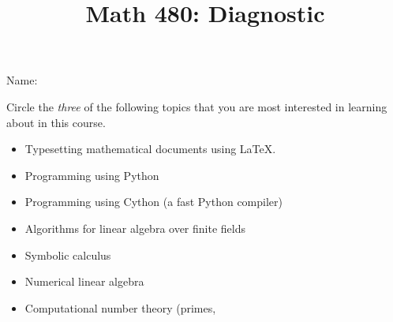 \documentclass{article}
\title{Math 480: Diagnostic}
\begin{document}
\maketitle

\newcommand{\q}[1]{\par\noindent{}#1\mbox{}\vspace{3em}\mbox{}}

\q{Name:}


\q{Circle the {\em three} of the following topics that you are most interested in learning about in this course.
\begin{itemize}

\item Typesetting mathematical documents using \LaTeX{}.
\item Programming using Python
\item Programming using Cython (a fast Python compiler)
\item Algorithms for linear algebra over finite fields
\item Symbolic calculus
\item Numerical linear algebra
\item Computational number theory (primes, 

\end{itemize}
}
\end{document}
